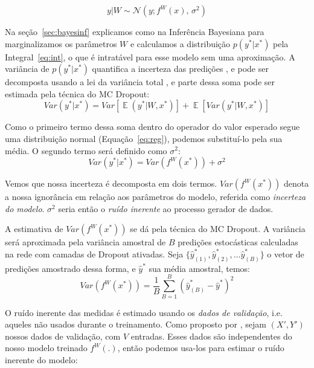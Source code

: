 \begin{equation}
  \label{eq:reg}
 y| W \sim \mathcal{N}(y;f^W(x),\,\sigma^2)
\end{equation}

 Na seção~\ref{sec:bayesinf} explicamos como na Inferência Bayesiana para marginalizamos os parâmetros $W$ e calculamos a distribuição $p(y^*
 | x^*)$ pela Integral~\ref{eq:int}, o que é intratável para esse modelo sem uma aproximação.
 A variância de $p(y^{*} | x^{*})$ quantifica a incerteza das predições
 \citep{dropbayes}, e pode ser decomposta usando a lei da variância total \citep{ubertime}, e parte dessa soma pode ser estimada pela técnica do MC Dropout: \\



\[ Var(y^* | x^*) = Var[\mathop{\mathbb{E}}(y^* | W,x^*)] +
  \mathop{\mathbb{E}}[Var(y^* | W,x^*)] \]

Como o primeiro termo dessa soma dentro do operador do valor esperado segue uma distribuição normal
(Equação~\ref{eq:reg}), podemos substituí-lo pela sua média. O
segundo termo será definido como $\sigma^2$: \\ 
 
\[ Var(y^* | x^*) = Var(f^W(x^*)) + \sigma^2 \] 


Vemos que nossa incerteza é decomposta em dois termos. $Var(f^W(x^*))$ denota a
nossa ignorância em relação aos parâmetros do modelo, referida como
\textit{incerteza do modelo}. $\sigma^2$ seria então o \textit{ruído inerente} ao
processo gerador de dados.
 
A estimativa de $Var(f^W(x^*))$ se dá pela técnica do MC Dropout. A variância
será aproximada pela variância amostral de $B$ predições estocásticas calculadas
na rede com camadas de Dropout ativadas. Seja $\{\hat{y}^*_{(1)},\hat{y}^*_{(2)}, \dots
\hat{y}^*_{(B)}\}$ o vetor de predições amostrado dessa forma, e $\hat{y}^*$ sua
média amostral, temos: \\

\[   Var(f^W(x^*))  = \frac{1}{B}\sum^B_{B=1}(\hat{y}^*_{(B)} - \hat{y}^*)^2  \]


O ruído inerente das medidas é estimado usando os \textit{dados de validação},
i.e. aqueles não
usados durante o treinamento. Como
proposto por \citep{ubertime}, sejam $(X',Y')$ nossos dados de validação, com
$V$ entradas. Esses dados são independentes do nosso modelo
treinado $f^W(.)$, então podemos usa-los para estimar o ruído inerente do
modelo: \\

